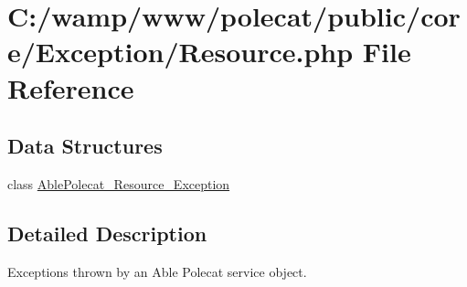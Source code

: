 \hypertarget{_exception_2_resource_8php}{}\section{C\+:/wamp/www/polecat/public/core/\+Exception/\+Resource.php File Reference}
\label{_exception_2_resource_8php}
\subsection*{Data Structures}
\begin{DoxyCompactItemize}
\item 
class \hyperlink{class_able_polecat___resource___exception}{Able\+Polecat\+\_\+\+Resource\+\_\+\+Exception}
\end{DoxyCompactItemize}


\subsection{Detailed Description}
Exceptions thrown by an Able Polecat service object. 